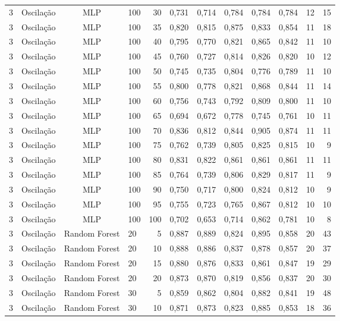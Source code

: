 \begin{longtable}{ccclrrrrrrrr}
3 & Oscilação & MLP & 100 & 30 & 0,731 & 0,714 & 0,784 & 0,784 & 0,784 & 12 & 15 \\
3 & Oscilação & MLP & 100 & 35 & 0,820 & 0,815 & 0,875 & 0,833 & 0,854 & 11 & 18 \\
3 & Oscilação & MLP & 100 & 40 & 0,795 & 0,770 & 0,821 & 0,865 & 0,842 & 11 & 10 \\
3 & Oscilação & MLP & 100 & 45 & 0,760 & 0,727 & 0,814 & 0,826 & 0,820 & 10 & 12 \\
3 & Oscilação & MLP & 100 & 50 & 0,745 & 0,735 & 0,804 & 0,776 & 0,789 & 11 & 10 \\
3 & Oscilação & MLP & 100 & 55 & 0,800 & 0,778 & 0,821 & 0,868 & 0,844 & 11 & 14 \\
3 & Oscilação & MLP & 100 & 60 & 0,756 & 0,743 & 0,792 & 0,809 & 0,800 & 11 & 10 \\
3 & Oscilação & MLP & 100 & 65 & 0,694 & 0,672 & 0,778 & 0,745 & 0,761 & 10 & 11 \\
3 & Oscilação & MLP & 100 & 70 & 0,836 & 0,812 & 0,844 & 0,905 & 0,874 & 11 & 11 \\
3 & Oscilação & MLP & 100 & 75 & 0,762 & 0,739 & 0,805 & 0,825 & 0,815 & 10 & 9 \\
3 & Oscilação & MLP & 100 & 80 & 0,831 & 0,822 & 0,861 & 0,861 & 0,861 & 11 & 11 \\
3 & Oscilação & MLP & 100 & 85 & 0,764 & 0,739 & 0,806 & 0,829 & 0,817 & 11 & 9 \\
3 & Oscilação & MLP & 100 & 90 & 0,750 & 0,717 & 0,800 & 0,824 & 0,812 & 10 & 9 \\
3 & Oscilação & MLP & 100 & 95 & 0,755 & 0,723 & 0,765 & 0,867 & 0,812 & 10 & 10 \\
3 & Oscilação & MLP & 100 & 100 & 0,702 & 0,653 & 0,714 & 0,862 & 0,781 & 10 & 8 \\
3 & Oscilação & Random Forest & 20 & 5 & 0,887 & 0,889 & 0,824 & 0,895 & 0,858 & 20 & 43 \\
3 & Oscilação & Random Forest & 20 & 10 & 0,888 & 0,886 & 0,837 & 0,878 & 0,857 & 20 & 37 \\
3 & Oscilação & Random Forest & 20 & 15 & 0,880 & 0,876 & 0,833 & 0,861 & 0,847 & 19 & 29 \\
3 & Oscilação & Random Forest & 20 & 20 & 0,873 & 0,870 & 0,819 & 0,856 & 0,837 & 20 & 30 \\
3 & Oscilação & Random Forest & 30 & 5 & 0,859 & 0,862 & 0,804 & 0,882 & 0,841 & 19 & 48 \\
3 & Oscilação & Random Forest & 30 & 10 & 0,871 & 0,873 & 0,823 & 0,885 & 0,853 & 18 & 36 \\

\end{longtable}
